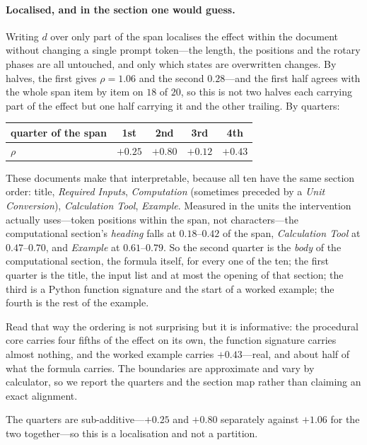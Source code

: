 \documentclass{article}
\newcommand{\dvec}{\ensuremath{d}}
\begin{document}
\paragraph{Localised, and in the section one would guess.} Writing $\dvec$ over
only part of the span localises the effect within the document without changing
a single prompt token---the length, the positions and the rotary phases are all
untouched, and only which states are overwritten changes. By halves, the first
gives $\rho = 1.06$ and the second $0.28$---and the first half agrees with the
whole span item by item on $18$ of $20$, so this is not two halves each carrying
part of the effect but one half carrying it and the other trailing. By quarters:
\begin{center}
\begin{tabular}{@{}lcccc@{}}
\toprule
quarter of the span & 1st & \textbf{2nd} & 3rd & 4th \\
\midrule
$\rho$ & $+0.25$ & $\mathbf{+0.80}$ & $+0.12$ & $+0.43$ \\
\bottomrule
\end{tabular}
\end{center}

These documents make that interpretable, because all ten have the same section
order: title, \emph{Required Inputs}, \emph{Computation} (sometimes preceded by a
\emph{Unit Conversion}), \emph{Calculation Tool}, \emph{Example}. Measured in the
units the intervention actually uses---token positions within the span, not
characters---the computational section's \emph{heading} falls at $0.18$--$0.42$
of the span, \emph{Calculation Tool} at $0.47$--$0.70$, and \emph{Example} at
$0.61$--$0.79$. So the second quarter is the \emph{body} of the computational
section, the formula itself, for every one of the ten; the first quarter is the
title, the input list and at most the opening of that section; the third is a
Python function signature and the start of a worked example; the fourth is the
rest of the example.

Read that way the ordering is not surprising but it is informative: the
procedural core carries four fifths of the effect on its own, the function
signature carries almost nothing, and the worked example carries $+0.43$---real,
and about half of what the formula carries. The boundaries are approximate and
vary by calculator, so we report the quarters and the section map rather than
claiming an exact alignment.

The quarters are sub-additive---$+0.25$ and $+0.80$ separately against $+1.06$
for the two together---so this is a localisation and not a partition.
\end{document}
